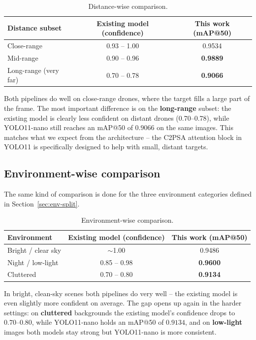 \documentclass[12pt,a4paper]{report}
\begin{document}
\begin{table}[H]
\centering
\caption{Distance-wise comparison.}
\label{tab:vs-prior-dist}
\small
\setlength{\tabcolsep}{4pt}
\begin{tabular}{lcc}
\toprule
\textbf{Distance subset} & \textbf{Existing model (confidence)} & \textbf{This work (mAP@50)} \\
\midrule
Close-range              & 0.93 -- 1.00 & 0.9534 \\
Mid-range                & 0.90 -- 0.96 & \textbf{0.9889} \\
Long-range (very far)    & 0.70 -- 0.78 & \textbf{0.9066} \\
\bottomrule
\end{tabular}
\end{table}

Both pipelines do well on close-range drones, where the target fills a
large part of the frame. The most important difference is on the
\textbf{long-range} subset: the existing model is clearly less confident on
distant drones (0.70--0.78), while YOLO11-nano still reaches an mAP@50 of
$0.9066$ on the same images. This matches what we expect from the
architecture -- the C2PSA attention block in YOLO11 is specifically
designed to help with small, distant targets.

\subsection{Environment-wise comparison}
The same kind of comparison is done for the three environment categories
defined in Section~\ref{sec:env-split}.

\begin{table}[H]
\centering
\caption{Environment-wise comparison.}
\label{tab:vs-prior-env}
\small
\setlength{\tabcolsep}{4pt}
\begin{tabular}{lcc}
\toprule
\textbf{Environment}       & \textbf{Existing model (confidence)} & \textbf{This work (mAP@50)} \\
\midrule
Bright / clear sky         & $\sim$1.00     & 0.9486 \\
Night / low-light          & 0.85 -- 0.98   & \textbf{0.9600} \\
Cluttered                  & 0.70 -- 0.80   & \textbf{0.9134} \\
\bottomrule
\end{tabular}
\end{table}

In bright, clean-sky scenes both pipelines do very well -- the existing
model is even slightly more confident on average. The gap opens up again
in the harder settings: on \textbf{cluttered} backgrounds the existing
model's confidence drops to 0.70--0.80, while YOLO11-nano holds an mAP@50 of
$0.9134$, and on \textbf{low-light} images both models stay strong but
YOLO11-nano is more consistent.
\end{document}
